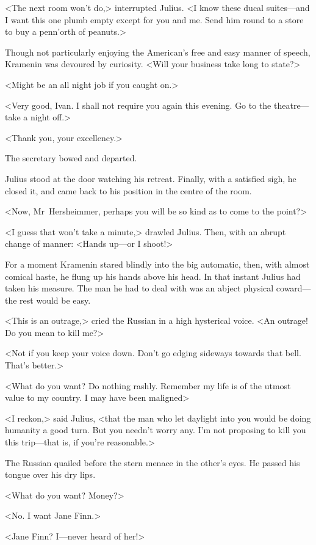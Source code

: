 <The next room won't do,> interrupted Julius. <I know these ducal suites—and I want this one plumb empty except for you and me. Send him round to a store to buy a penn'orth of peanuts.>

Though not particularly enjoying the American's free and easy manner of speech, Kramenin was devoured by curiosity. <Will your business take long to state?>

<Might be an all night job if you caught on.>

<Very good, Ivan. I shall not require you again this evening. Go to the theatre—take a night off.>

<Thank you, your excellency.>

The secretary bowed and departed.

Julius stood at the door watching his retreat. Finally, with a satisfied sigh, he closed it, and came back to his position in the centre of the room.

<Now, Mr~Hersheimmer, perhaps you will be so kind as to come to the point?>

<I guess that won't take a minute,> drawled Julius. Then, with an abrupt change of manner: <Hands up—or I shoot!>

For a moment Kramenin stared blindly into the big automatic, then, with almost comical haste, he flung up his hands above his head. In that instant Julius had taken his measure. The man he had to deal with was an abject physical coward—the rest would be easy.

<This is an outrage,> cried the Russian in a high hysterical voice. <An outrage! Do you mean to kill me?>

<Not if you keep your voice down. Don't go edging sideways towards that bell. That's better.>

<What do you want? Do nothing rashly. Remember my life is of the utmost value to my country. I may have been maligned\longdash>

<I reckon,> said Julius, <that the man who let daylight into you would be doing humanity a good turn. But you needn't worry any. I'm not proposing to kill you this trip—that is, if you're reasonable.>

The Russian quailed before the stern menace in the other's eyes. He passed his tongue over his dry lips.

<What do you want? Money?>

<No. I want Jane Finn.>

<Jane Finn? I—never heard of her!>

